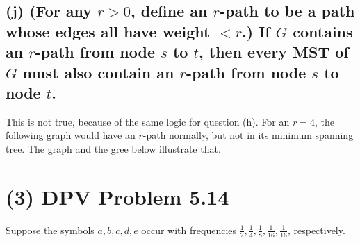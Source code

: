 \documentclass[10pt,letterpaper]{article}
\begin{document}
\subsection*{(j) (For any $r > 0$, define an $r$-path to be a path whose edges all have weight $< r$.) If $G$ contains an $r$-path from node $s$ to $t$, then every MST of $G$ must also contain an $r$-path from node $s$ to node $t$.}
This is not true, because of the same logic for question (h). For an $r = 4$, the following graph would have an $r$-path normally, but not in its minimum spanning tree. The graph and the gree below illustrate that. 
\begin{figure}[h!]
\centering
{}
\hfill
{}
\end{figure}

\section{(3) DPV Problem 5.14}
\noindent Suppose the symbols $a, b, c, d, e$ occur with frequencies $\frac{1}{2}, \frac{1}{4}, \frac{1}{8}, \frac{1}{16}, \frac{1}{16}$, respectively. 
\end{document}
